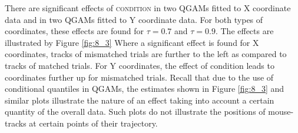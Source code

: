 There are significant effects of \textsc{condition} in two QGAMs fitted to X coordinate data and in two QGAMs fitted to Y coordinate data. For both types of coordinates, these effects are found for $\tau=0.7$ and $\tau=0.9$. The effects are illustrated by Figure \ref{fig:8_3} Where a significant effect is found for X coordinates, tracks of mismatched trials are further to the left as compared to tracks of matched trials. For Y coordinates, the effect of condition leads to coordinates further up for mismatched trials. Recall that due to the use of conditional quantiles in QGAMs, the estimates shown in Figure \ref{fig:8_3} and similar plots illustrate the nature of an effect taking into account a certain quantity of the overall data. Such plots do not illustrate the positions of mouse-tracks at certain points of their trajectory.

